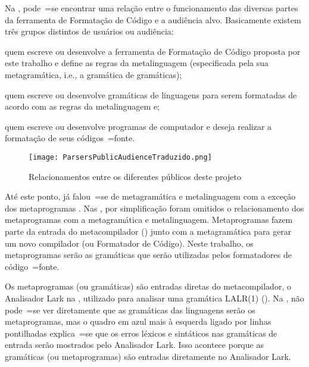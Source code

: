 Na ,
pode~=se encontrar uma relação entre o funcionamento das diversas partes da ferramenta de Formatação de Código e
a audiência alvo.
Basicamente existem três grupos distintos de usuários ou
audiência:
\begin{inparaenum}[1)]
\item quem escreve ou
desenvolve a ferramenta de Formatação de Código proposta por este trabalho e
define as regras da metalinguagem (especificada pela sua metagramática,
i.e.,
a gramática de gramáticas);
\item quem escreve ou
desenvolve gramáticas de linguagens para serem formatadas de acordo com as regras da metalinguagem e;
\item quem escreve ou
desenvolve programas de computador e
deseja realizar a formatação de seus códigos~=fonte.
\end{inparaenum}%
\begin{figure}[!htb]
\caption{Relacionamentos entre os diferentes públicos deste projeto}
\label{figure:ParsersPublicAudienceTraduzido}
\centering
\texttt{[image: ParsersPublicAudienceTraduzido.png]}
\end{figure}

Até este ponto,
já falou~=se de metagramática e
metalinguagem com a exceção dos metaprogramas \cite{tradeoffsInMetaprogramming}.
Nas ,
por simplificação foram omitidos o relacionamento dos metaprogramas com a metagramática e
metalinguagem.
Metaprogramas fazem parte da entrada do metacompilador () junto com a metagramática para gerar um novo compilador (ou Formatador de Código).
Neste trabalho,
os metaprogramas serão as gramáticas que serão utilizadas pelos formatadores de código~=fonte.

Os metaprogramas (ou gramáticas) são entradas diretas do metacompilador,
o Analisador Lark na ,
utilizado para analisar uma gramática LALR(1) ().
Na ,
não pode~=se ver diretamente que as gramáticas das linguagens serão os metaprogramas,
mas o quadro em azul mais à esquerda ligado por linhas pontilhadas explica~=se que os erros léxicos e
sintáticos nas gramáticas de entrada serão mostrados pelo Analisador Lark.
Isso acontece porque as gramáticas (ou metaprogramas) são entradas diretamente no Analisador Lark.

